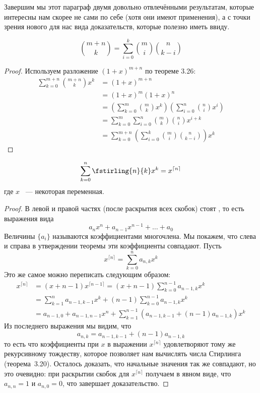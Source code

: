 Завершим мы этот параграф двумя довольно отвлечёнными результатам, которые интересны нам скорее не сами по себе (хотя они имеют применения), а с точки зрения нового для нас вида доказательств, которые полезно иметь ввиду.

\begin{thm}
$${m+n \choose k} = \sum_{i=0}^k {m\choose i}{n\choose k-i}$$
\end{thm}
\begin{proof}
Используем разложение $(1+x)^{m+n}$ по теореме 3.26:
\begin{align*}
\sum_{k=0}^{m+n}{m+n \choose k}x^k & = (1+x)^{m+n} \\
& = (1+x)^m(1+x)^n \\
& = \left(\sum_{k=0}^m{m\choose k}x^k\right) \left(\sum_{i=0}^n {n\choose i}x^i\right) \\
& = \sum_{k=0}^m\sum_{i=0}^n{m\choose k}{n\choose i}x^{i+k} \\
& = \sum_{k=0}^{m+n} \left( \sum_{i=0}^k {m\choose i}{n\choose k-i} \right) x^k
\end{align*}
\end{proof}

\begin{thm}
$$\sum_{k=0}^n \fstirling{n}{k}x^k = x^{\lceil n \rceil}$$
где $x$ ~— некоторая переменная.
\end{thm}
\begin{proof}
В левой и правой частях (после раскрытия всех скобок) стоят , то есть выражения вида
$$a_n x^n + a_{n-1}x^{n-1} + \ldots + a_{0}$$
Величины $\{a_i\}$ называются коэффициентами многочлена. Мы покажем, что слева и справа в утверждении теоремы эти коэффициенты совпадают. Пусть
$$x^{\lceil n \rceil} = \sum_{k=0}^n a_{n, k} x^k$$
Это же самое можно переписать следующим образом:
\begin{align*}
x^{\lceil n \rceil} &= (x+n-1)x^{\lceil n-1 \rceil} = (x+n-1)\sum_{k=0}^{n-1}a_{n-1, k}x^k \\
& = \sum_{k=1}^n a_{n-1, k-1} x^k + (n-1)\sum_{k=0}^{n-1}a_{n-1,k} x^k \\
& = a_{n-1,0} + a_{n-1, n-1}x^n + \sum_{k=1}^{n-1} (a_{n-1,k-1} + (n-1) a_{n-1, k})x^k
\end{align*}
Из последнего выражения мы видим, что
$$a_{n, k} = a_{n-1, k-1} + (n-1)a_{n-1, k}$$
то есть что коэффициенты при $x$ в выражении $x^{\lceil n \rceil}$ удовлетворяют тому же рекурсивному тождеству, которое позволяет нам вычислять числа Стирлинга (теорема~3.20). Осталось доказать, что начальные значения так же совпадают, но это очевидно: при раскрытии скобок для $x^{\lceil n \rceil}$ получаем в явном виде, что $a_{n, n} = 1$ и $a_{n, 0} = 0$, что завершает доказательство.
\end{proof}